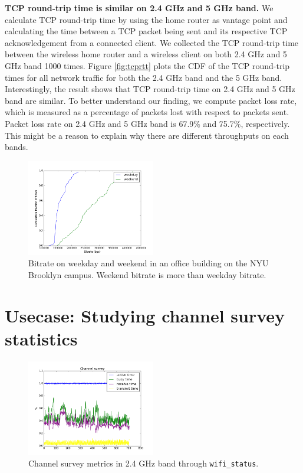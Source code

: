 \textbf{TCP round-trip time is similar on 2.4 GHz and 5 GHz band.} We calculate TCP round-trip time by using the home router as vantage point and calculating the time between a TCP packet being sent and its respective TCP acknowledgement from a connected client. We collected the TCP round-trip time between the wireless home router and a wireless client on both 2.4 GHz and 5 GHz band 1000 times. Figure \ref{fig:tcprtt} plots the CDF of the TCP round-trip times for all network traffic for both the 2.4 GHz band and the 5 GHz band. Interestingly, the result shows that TCP round-trip time on 2.4 GHz and 5 GHz band are similar. To better understand our finding, we compute packet loss rate, which is measured as a percentage of packets lost with respect to packets sent. Packet loss rate on 2.4 GHz and 5 GHz band is 67.9\% and 75.7\%, respectively. This might be a reason to explain why there are different throughputs on each bands.  

\begin{figure}
\centering
\includegraphics[width=0.5\textwidth]{figure/bitrate(weekday_vs_weekend).png}
\caption{Bitrate on weekday and weekend in an office building on the NYU Brooklyn campus. Weekend bitrate is more than weekday bitrate.} 
\label{fig:compare}
\end{figure}  

\section{Usecase: Studying channel survey statistics}
\label{sec.usecase2}

\begin{figure}
\centering
\includegraphics[width=0.5\textwidth]{figure/channel.png}
\caption{Channel survey metrics in 2.4 GHz band through \texttt{wifi\_status}.} 
\label{fig:channelsurvey}
\end{figure}

